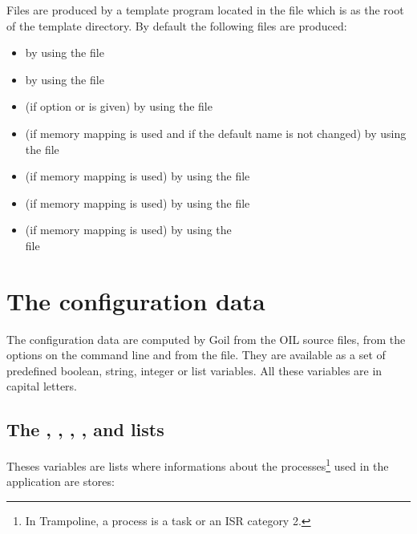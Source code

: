 Files are produced by a template program located in the  file which is as the root of the template directory. By default the following files are produced:
\begin{itemize}
\item {} by using the  file
\item {} by using the  file
\item {} (if option  or  is given) by using the  file
\item {} (if memory mapping is used and if the default name is not changed) by using the  file
\item {} (if memory mapping is used) by using the  file
\item {} (if memory mapping is used) by using the  file
\item {} (if memory mapping is used) by using the\\ file
\end{itemize}

\section{The configuration data}

The configuration data are computed by Goil from the OIL source files, from the options on the command line and from the  file. They are available as a set of predefined boolean, string, integer or list variables. All these variables are in capital letters.


\subsection{The , , , ,  and  lists}

Theses variables are lists where informations about the processes\footnote{In Trampoline, a process is a task or an ISR category 2.} used in the application are stores:


